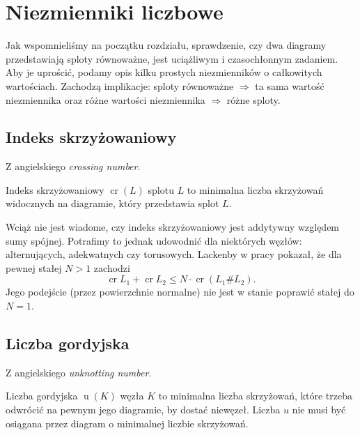 \section{Niezmienniki liczbowe}
Jak wspomnieliśmy na początku rozdziału, sprawdzenie, czy dwa diagramy przedstawiają sploty równoważne, jest uciążliwym i czasochłonnym zadaniem.
Aby je uprościć, podamy opis kilku prostych niezmienników o całkowitych wartościach.
Zachodzą implikacje: sploty równoważne $\Rightarrow$ ta sama wartość niezmiennika oraz różne wartości niezmiennika $\Rightarrow$ różne sploty.

\subsection{Indeks skrzyżowaniowy} %
\label{sub:crossing_number}
Z angielskiego \emph{crossing number}.

\begin{definition}
    Indeks skrzyżowaniowy $\operatorname{cr}(L)$ splotu $L$ to minimalna liczba skrzyżowań widocznych na diagramie, który przedstawia splot $L$.
\end{definition}

Wciąż nie jest wiadome, czy indeks skrzyżowaniowy jest addytywny względem sumy spójnej.
Potrafimy to jednak udowodnić dla niektórych węzłów: alternujących, adekwatnych czy torusowych.
Lackenby w pracy \cite{lackenby09} pokazał, że dla pewnej stałej $N > 1$ zachodzi
\[
    \operatorname{cr} L_1 + \operatorname{cr} L_2 \le N \cdot \operatorname{cr} (L_1 \# L_2).
\]
Jego podejście (przez powierzchnie normalne) nie jest w stanie poprawić stałej do $N = 1$.


\subsection{Liczba gordyjska} %
\label{sub:unknotting_number}
Z angielskiego \emph{unknotting number}.

\begin{definition}
    Liczba gordyjska $\operatorname{u}(K)$ węzła $K$ to minimalna liczba skrzyżowań,
    które trzeba odwrócić na pewnym jego diagramie, by dostać niewęzeł.
    Liczba $u$ nie musi być osiągana przez diagram o minimalnej liczbie skrzyżowań.
\end{definition}

